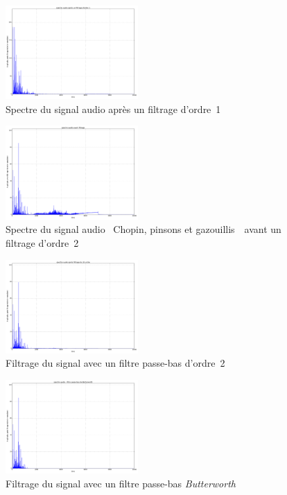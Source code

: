 \documentclass[a4paper]{article}
\begin{document}
\begin{multicols}
\begin{figure}[H]
	\centering
	\includegraphics[width=0.45\textwidth]{figures/Capture19.png}
	\caption{Spectre du signal audio après un filtrage d'ordre~1}
\end{figure}

\begin{figure}[H]
	\centering
	\includegraphics[width=0.45\textwidth]{figures/Capture20.png}
	\caption{Spectre du signal audio \guillemotleft~{\sc Chopin}, pinsons et gazouillis~\guillemotright\ avant un filtrage d'ordre~2}
\end{figure}

\begin{figure}[H]
	\centering
	\includegraphics[width=0.45\textwidth]{figures/Capture21.png}
	\caption{Filtrage du signal avec un filtre passe-bas d'ordre~2}
\end{figure}

\begin{figure}[H]
	\centering
	\includegraphics[width=0.45\textwidth]{figures/Capture22.png}
	\caption{Filtrage du signal avec un filtre passe-bas {\it Butterworth}}
\end{figure}
\end{multicols}
\end{document}
